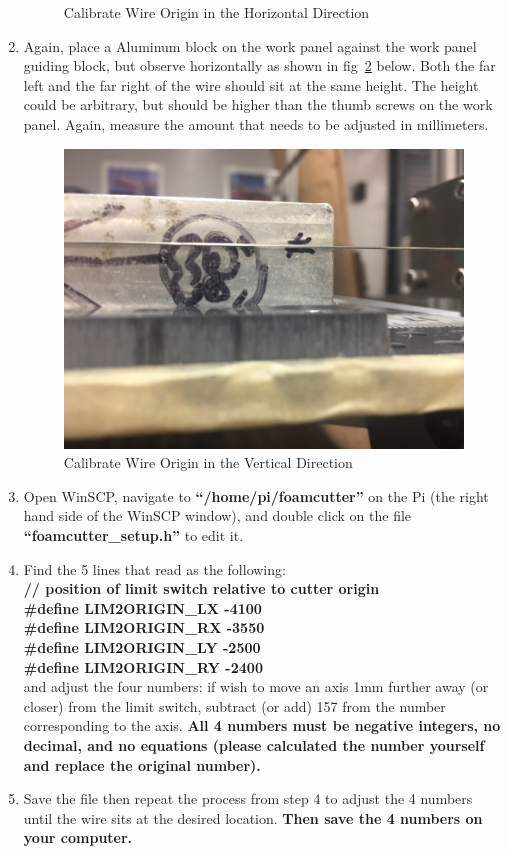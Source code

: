 \documentclass[titlepage,12pt,letter]{report}
\numberwithin{equation}{chapter}
\begin{document}
\begin{enumerate}[noitemsep,topsep=0pt]
\begin{figure} [H]
	\caption{Calibrate Wire Origin in the Horizontal Direction}
	\label{fig:zero1}
\end{figure}
\item Again, place a Aluminum block on the work panel against the work panel guiding block, but observe horizontally as shown in fig~\ref{fig:zero2} below. Both the far left and the far right of the wire should sit at the same height. The height could be arbitrary, but should be higher than the thumb screws on the work panel. Again, measure the amount that needs to be adjusted in millimeters.
\begin{figure} [H]
	\includegraphics[width = 0.8\linewidth]{./Figures/zero_wire_2.jpg}
	\caption{Calibrate Wire Origin in the Vertical Direction}
	\label{fig:zero2}
\end{figure}
\item Open WinSCP, navigate to \textbf{``/home/pi/foamcutter''} on the Pi (the right hand side of the WinSCP window), and double click on the file \textbf{``foamcutter\_setup.h''} to edit it. 
\item Find the 5 lines that read as the following:\\
\textbf{// position of limit switch relative to cutter origin}\\
\textbf{\#define LIM2ORIGIN\_LX -4100}\\
\textbf{\#define LIM2ORIGIN\_RX -3550}\\
\textbf{\#define LIM2ORIGIN\_LY -2500}\\
\textbf{\#define LIM2ORIGIN\_RY -2400}\\
and adjust the four numbers: if wish to move an axis 1mm further away (or closer) from the limit switch, subtract (or add) 157 from the number corresponding to the axis. \textbf{All 4 numbers must be negative integers, no decimal, and no equations (please calculated the number yourself and replace the original number).}
\item Save the file then repeat the process from step 4 to adjust the 4 numbers until the wire sits at the desired location. \textbf{Then save the 4 numbers on your computer.}
\end{enumerate}
\end{document}
